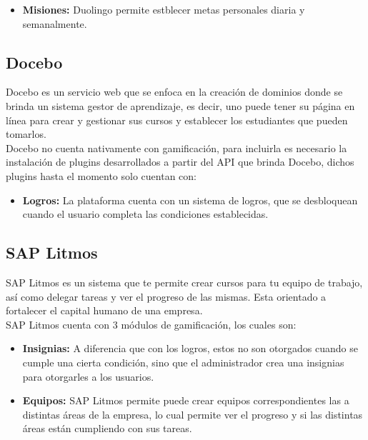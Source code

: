 \begin{multicols*}{2}
\begin{itemize}
    \item {\bf Misiones:} Duolingo permite estblecer metas personales diaria y
        semanalmente.

    \end{itemize}


\subsection{Docebo}

 Docebo \cite{PagDocebo} es un servicio web que se enfoca en la creación de dominios donde se brinda
 un sistema gestor de aprendizaje, es decir, uno puede tener su página en línea para crear y gestionar
 sus cursos y establecer los estudiantes que pueden tomarlos.\\

 \noindent Docebo no cuenta nativamente con gamificación, para incluirla es necesario la instalación
 de plugins desarrollados a partir del API que brinda Docebo, dichos plugins hasta el momento solo
 cuentan con:

    \begin{itemize}
    \item {\bf Logros:} La plataforma cuenta con un sistema de logros, que se
                        desbloquean cuando el usuario completa las condiciones
                        establecidas.
    \end{itemize}

\subsection{SAP Litmos}

 SAP Litmos \cite{PagSAPLitmos} es un sistema que te permite crear cursos para tu equipo de trabajo,
 así como delegar tareas y ver el progreso de las mismas. Esta orientado a
 fortalecer el capital humano de una empresa.\\

    \noindent SAP Litmos cuenta con 3 módulos de gamificación, los cuales son:

    \begin{itemize}
        \item {\bf Insignias:} A diferencia que con los logros, estos
        no son otorgados cuando se cumple una cierta condición, sino
        que el administrador crea una insignias para otorgarles a los usuarios.

        \item {\bf Equipos: } SAP Litmos permite puede crear equipos
        correspondientes las a distintas áreas de la empresa, lo cual permite ver
        el progreso y si las distintas áreas están cumpliendo con sus tareas.


\end{itemize}
\end{multicols*}
